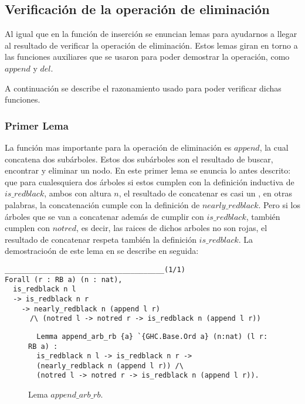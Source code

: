 \subsection{Verificación de la operación de eliminación}
Al igual que en la funci\'on de inserci\'on se enuncian lemas para ayudarnos a llegar al resultado
de verificar la operación de eliminación. Estos lemas giran en torno a las funciones auxiliares
que se usaron para poder demostrar la operación, como \hyperref[func_app]{$append$} y 
\hyperref[func_del]{$del$}.

A continuación se describe el razonamiento usado para poder verificar dichas funciones.

\subsubsection{Primer Lema}


La funci\'on mas importante para la operaci\'on de eliminaci\'on es \hyperref[func_app]{$append$}, 
la cual concatena dos subárboles. Estos dos subárboles son el resultado de buscar, encontrar y 
eliminar un nodo. En este primer lema se enuncia lo antes descrito: que para cualesquiera dos 
\'arboles si estos cumplen con la definici\'on inductiva de 
\hyperref[inductive_isRedB]{$is\_redblack$}, ambos con altura $n$, el resultado de concatenar es 
casi un {\arn}, en otras palabras, la concatenaci\'on cumple con la definición de
\hyperref[inductive_isRedB]{$nearly\_redblack$}. Pero si los \'arboles que se van a concatenar 
además de cumplir con \hyperref[inductive_isRedB]{$is\_redblack$}, también cumplen con $notred$, es 
decir, las raices de dichos arboles no son rojas, el resultado de concatenar respeta también la 
definici\'on \hyperref[inductive_isRedB]{$is\_redblack$}. La demostracio\'on de este lema en {\coq} 
se describe en seguida:

\begin{verbatim}
______________________________________(1/1)
Forall (r : RB a) (n : nat),
  is_redblack n l
  -> is_redblack n r
    -> nearly_redblack n (append l r)
      /\ (notred l -> notred r -> is_redblack n (append l r))
\end{verbatim}

\begin{figure}[!ht]
  \centering
  \captionsetup{justification=centering}
  \begin{verbatim}
  Lemma append_arb_rb {a} `{GHC.Base.Ord a} (n:nat) (l r: RB a) :
  is_redblack n l -> is_redblack n r ->
  (nearly_redblack n (append l r)) /\
  (notred l -> notred r -> is_redblack n (append l r)).
  \end{verbatim}
  \caption{Lema $append\_arb\_rb$.}
  \label{lema_4}
  \end{figure}

